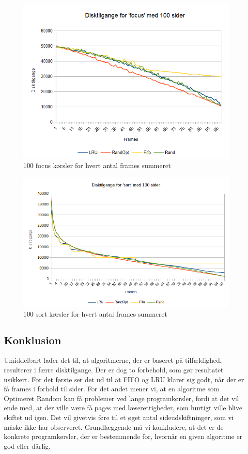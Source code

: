 \begin{figure}[ht]
\centerline{\includegraphics[scale=0.8]{graph/stat_focus}}
\caption{100 focus kørsler for hvert antal frames summeret}
\label{fig:focus}
\end{figure}
\pagebreak
\begin{figure}[ht]
\centerline{\includegraphics[scale=0.75]{graph/stat_sort}}
\caption{100 sort kørsler for hvert antal frames summeret}
\label{fig:sort}
\end{figure}

\subsection{Konklusion}
Umiddelbart lader det til, at algoritmerne, der er baseret på tilfældighed, resulterer i færre disktilgange. Der er dog to forbehold, som gør resultatet usikkert. For det første ser det ud til at FIFO og LRU klarer sig godt, når der er få frames i forhold til sider. For det andet mener vi, at en algoritme som Optimeret Random kan få problemer ved lange programkørsler, fordi at det vil ende med, at der ville være få pages med læserettigheder, som hurtigt ville blive skiftet ud igen. Det vil givetvis føre til et øget antal sideudskiftninger, som vi måske ikke har observeret. Grundlæggende må vi konkludere, at det er de konkrete programkørsler, der er bestemmende for, hvornår en given algoritme er god eller dårlig.
